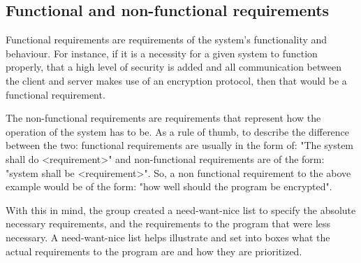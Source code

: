 \subsection{Functional and non-functional requirements}

Functional requirements are requirements of the system's functionality and behaviour. For instance, if it is a necessity for a given system to function properly, that a high level of security is added and all communication between the client and server makes use of an encryption protocol, then that would be a functional requirement\cite{SEF01}.

The non-functional requirements are requirements that represent how the operation of the system has to be. 
As a rule of thumb, to describe the difference between the two: functional requirements are usually in the form of: "The system shall do <requirement>" and non-functional requirements are of the form: "system shall be <requirement>". So, a non functional requirement to the above example would be of the form: "how well should the program be encrypted".

With this in mind, the group created a need-want-nice list to specify the absolute necessary requirements, and the requirements to the program that were less necessary. A need-want-nice list helps illustrate and set into boxes what the actual requirements to the program are and how they are prioritized.





